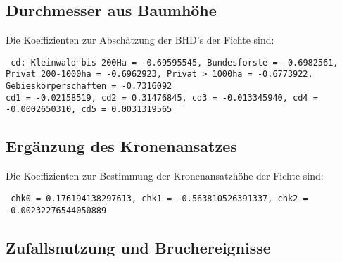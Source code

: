 \documentclass[twocolumn]{scrartcl}
\begin{document}
\subsection{Durchmesser aus Baumhöhe}

Die Koeffizienten zur Abschätzung der BHD's der Fichte sind:

\texttt{
  cd: Kleinwald bis 200Ha = -0.69595545, Bundesforste = -0.6982561, Privat 200-1000ha = -0.6962923, Privat > 1000ha = -0.6773922, Gebieskörperschaften = -0.7316092\\
  cd1 = -0.02158519, cd2 = 0.31476845, cd3 = -0.013345940, cd4 = -0.0002650310, cd5 = 0.0031319565\\
}

\subsection{Ergänzung des Kronenansatzes}

Die Koeffizienten zur Bestimmung der Kronenansatzhöhe der Fichte sind:

\texttt{
  chk0 = 0.176194138297613, chk1 = -0.563810526391337, chk2 = -0.00232276544050889
}

\subsection{Zufallsnutzung und Bruchereignisse}
\end{document}
